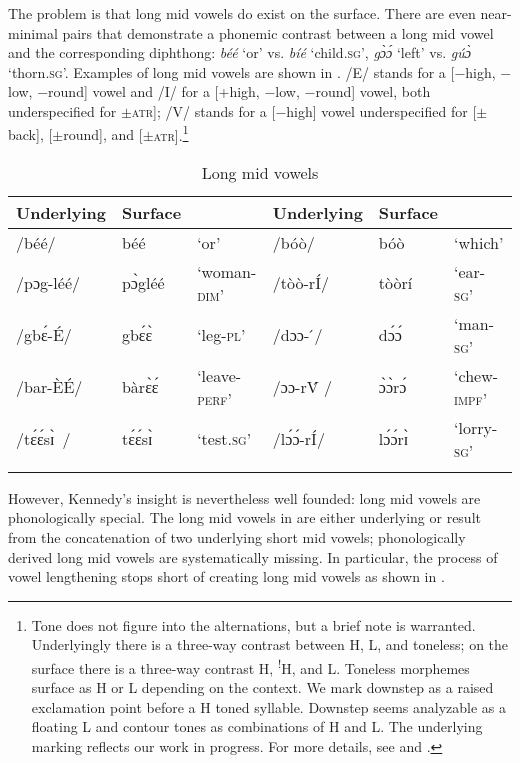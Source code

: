 \documentclass[output=paper
,newtxmath
,modfonts
,nonflat]{langsci/langscibook}
\begin{document}
The problem is that long mid vowels do exist on the surface. There are even near-minimal pairs that demonstrate a phonemic contrast between a long mid vowel and the corresponding diphthong: \textit{béé} ‘or’ vs. \textit{bíé} ‘child.\textsc{sg}’, \textit{gɔ̀ɔ́} `left' vs. \textit{gúɔ̀} `thorn.\textsc{sg}'. Examples of long mid vowels are shown in . /E/ stands for a [$-$high, $-$low, $-$round] vowel and /I/ for a [+high, $-$low, $-$round] vowel, both underspecified for {$\pm$}{\textsc{atr}}{]; /V/ stands for a [$-$high] vowel underspecified for [$\pm$back], [$\pm$round], and [$\pm$}{\textsc{atr}}{].}\footnote{Tone does not figure into the  alternations, but a brief note is warranted. Underlyingly there is a three-way contrast between H, L, and toneless; on the surface there is a three-way contrast H, \textsuperscript{!}H, and L. Toneless morphemes surface as H or L depending on the context. We mark downstep as a raised exclamation point before a H toned syllable. Downstep seems analyzable as a floating L and contour tones as combinations of H and L. The underlying  marking reflects our work in progress. For more details, see \citet[42-49]{Kennedy1966} and \citet{Anttila&Bodomo2000}.}

\begin{table}
\begin{tabularx}{\textwidth}{llllll}
\lsptoprule
{Underlying} & {Surface} & & {Underlying} & {Surface} &\\
\midrule
/béé/ &	béé &	‘or’ &	/bóò/ &	bóò  &	‘which’\\
/pɔg-léé/ &	pɔ̀gléé &	‘woman-\textsc{dim}’ &	/tòò-rÍ/ &	tòòrí &	‘ear-\textsc{sg}’\\
/gbɛ́-É/ &	gbɛ́ɛ̀  &	‘leg-\textsc{pl}’ &	/dɔɔ- ́/ &	dɔ́ɔ́ &	‘man-\textsc{sg}’\\
/bar-ÈÉ/ &	bàrɛ̀ɛ́ &	‘leave-\textsc{perf}’ &	/ɔɔ-rV́ / &	ɔ̀ɔ̀rɔ́ &	‘chew-\textsc{impf}’\\
/tɛ́ɛ́sɪ̀ / &	tɛ́ɛ́sɪ̀  &	‘test.\textsc{sg}’ &	/lɔ́ɔ́-rÍ/ &	lɔ́ɔ́rɪ̀  &	‘lorry-\textsc{sg}’\\
\lspbottomrule
\end{tabularx}
\caption{Long mid vowels}
\label{tab:anttila:2}
\end{table}



{However, Kennedy’s insight is nevertheless well founded: long mid vowels are phonologically special.} {The long mid vowels in  are} {either underlying or result from the concatenation of two underlying short mid vowels; phonologically derived long mid vowels are systematically missing. In particular, the process of vowel lengthening stops short of creating long mid vowels as shown in .}
\end{document}
